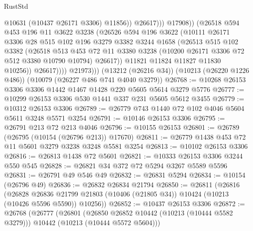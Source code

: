 \begin{lexlean}{RustStd}
\begin{coremodule}
{\begin{coremodule}
{{{{{{{{{{{{{{{{{{{{{{{{{{                              @10631
                              (@10437 @26171 @3306)
                              @11856))
                          @26617)))
                    @17908))
                (@26518
                  @594
                  @453
                  @196
                  @11
                  @3622
                  @3238
                  (@26526
                    @594
                    @196
                    @3622
                    (@10111
                      @26171
                      @3306
                      @28
                      @515
                      @102
                      @196
                      @3279
                      @3382
                      @3244
                      @1658
                      (@26513
                        @515
                        @102
                        @3382
                        (@26518
                          @513
                          @453
                          @72
                          @11
                          @3380
                          @3238
                          (@10200 @26171 @3306 @72 @512 @3380 @10790 @10794)
                          @26617))
                      @11821
                      @11824
                      @11827
                      @11830
                      @10256))
                  @26617))))
          @21973)))
    (@13212 (@26216 @34))
    (@10213 (@26220 @1226 @486))
    (@10079 (@26227 @486 @741 @4040 @3279))
@26768 := @10268 @26153 @3306 @3306 @1442 @1467 @1428 @220 @5605 @5614 @3279 @5776
@26777 := @10299 @26153 @3306 @530 @1441 @337 @231 @5605 @5612 @3455
@26779 := @10312 @26153 @3306
@26789 := @26779 @743 @1440 @72 @102 @4046 @5604 @5611 @3248 @5571 @3254
@26791 := @10146 @26153 @3306
@26795 := @26791 @213 @72 @213 @4046
@26796 := @10155 @26153
@26801 := @26789 (@26795 (@10154 (@26796 @213)) @17670)
@26811 := @26779 @1438 @453 @72 @11 @5601 @3279 @3238 @3248 @5581 @3254
@26813 := @10102 @26153 @3306
@26816 := @26813 @1438 @72 @5601
@26821 := @10333 @26153 @3306 @3244 @550 @545
@26828 := @26821 @34 @372 @72 @5294 @3267 @5589 @5596
@26831 := @26791 @49 @546 @49
@26832 := @26831 @5294
@26834 := @10154 (@26796 @49)
@26836 := @26832 @26834 @21794
@26850 := @26811
    (@26816
      (@26828
        @26836
        @21799
        @21803
        (@10406 (@21805 @34))
        @10424
        (@10213 (@10426 @5596 @5590))
        @10256))
@26852 := @10437 @26153 @3306
@26872 := @26768
    (@26777
      (@26801
        (@26850 @26852 @10442 (@10213 (@10444 @5582 @3279)))
        @10442
        (@10213 (@10444 @5572 @5604)))
}}}}}}}}}}}}}}}}}}}}}}}}}}
\end{coremodule}}
\end{coremodule}
\end{lexlean}
